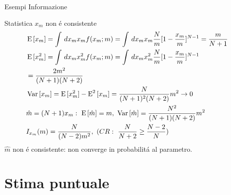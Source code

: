 \begin{wordonframe}{Esempi Informazione}
\begin{block}{Statistica $x_m$ non \'e consistente}
\begin{align*}
&\E{[x_m]}=\int\,dx_mx_mf(x_m;m)=\int\,dx_mx_m\frac{N}{m}[1-\frac{x_m}{m}]^{N-1}=\frac{m}{N+1}\\
&\E{[x_m^2]}=\int\,dx_mx_m^2f(x_m;m)=\int\,dx_mx_m^2\frac{N}{m}[1-\frac{x_m}{m}]^{N-1}\\
&=\frac{2m^2}{(N+1)(N+2)}\\
&\var{[x_m]}=\E{[x_m^2]}-\E^2{[x_m]}=\frac{N}{(N+1)^2(N+2)}m^2\to0\\
&\hat{m}=(N+1)x_m:\ \E{[\hat{m}]}=m,\ \var{[\hat{m}]}=\frac{N^2}{(N+1)(N+2)}m^2\\
&I_{x_m}(m)=\frac{N}{(N-2)m^2},\ (CR:\ \frac{N}{N+2}\geq\frac{N-2}{N})
\end{align*}
$\hat{m}$ non \'e consistente: non converge in probabilit\'a al parametro.
\end{block}
\end{wordonframe}

\section{Stima puntuale}

